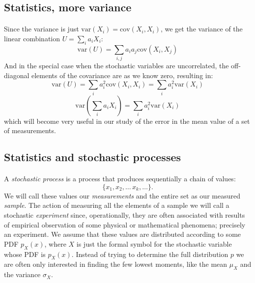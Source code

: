 \documentclass[%
oneside,                 %
final,                   %
10pt]{article}
\begin{document}
\subsection{Statistics, more variance}

\paragraph{}
Since the variance is just $\mathrm{var}(X_i) = \mathrm{cov}(X_i, X_i)$, we get
the variance of the linear combination $U = \sum_i a_i X_i$:
\begin{equation}
\mathrm{var}(U) = \sum_{i,j}a_i a_j \mathrm{cov}(X_i, X_j)
\label{eq:variance_linear_combination}
\end{equation}
And in the special case when the stochastic variables are
uncorrelated, the off-diagonal elements of the covariance are as we
know zero, resulting in:
\[
\mathrm{var}(U) = \sum_i a_i^2 \mathrm{cov}(X_i, X_i) = \sum_i a_i^2 \mathrm{var}(X_i)
\]
\[
\mathrm{var}(\sum_i a_i X_i) = \sum_i a_i^2 \mathrm{var}(X_i)
\]
which will become very useful in our study of the error in the mean
value of a set of measurements.



\subsection{Statistics and stochastic processes}

\paragraph{}
A \emph{stochastic process} is a process that produces sequentially a
chain of values:
\[
\{x_1, x_2,\dots\,x_k,\dots\}.
\]
We will call these
values our \emph{measurements} and the entire set as our measured
\emph{sample}.  The action of measuring all the elements of a sample
we will call a stochastic \emph{experiment} since, operationally,
they are often associated with results of empirical observation of
some physical or mathematical phenomena; precisely an experiment. We
assume that these values are distributed according to some 
PDF $p_X^{\phantom X}(x)$, where $X$ is just the formal symbol for the
stochastic variable whose PDF is $p_X^{\phantom X}(x)$. Instead of
trying to determine the full distribution $p$ we are often only
interested in finding the few lowest moments, like the mean
$\mu_X^{\phantom X}$ and the variance $\sigma_X^{\phantom X}$.
\end{document}
